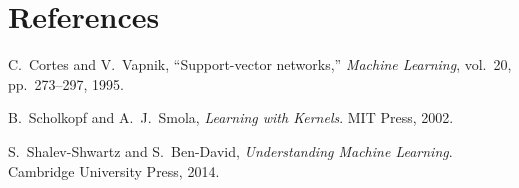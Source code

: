 \documentclass[12pt,a4paper]{article}
\begin{document}
\section{References}
\begin{enumerate}[label={[\arabic*]}]
  \item C.\ Cortes and V.\ Vapnik, ``Support-vector networks,'' \textit{Machine Learning}, vol.\ 20, pp.\ 273--297, 1995.
  \item B.\ Scholkopf and A.\ J.\ Smola, \textit{Learning with Kernels}. MIT Press, 2002.
  \item S.\ Shalev-Shwartz and S.\ Ben-David, \textit{Understanding Machine Learning}. Cambridge University Press, 2014.
\end{enumerate}
\end{document}
